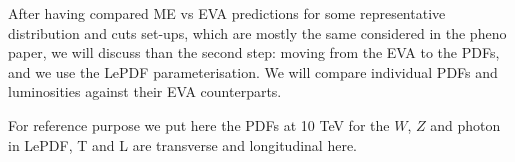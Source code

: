 \documentclass[a4paper,11pt]{article}
\begin{document}
\begin{table}[!t]
\begin{center}
\caption{
EW chiral couplings and coupling strength normalizations used in the EVA for fermions $f,f'$ with weak isospin charge $(T_3^f)_L=\pm1/2$ and electric charge $Q^f$, with normalization $Q^\ell=-1$.
}
\label{tab:ewa_coup}
\end{center}
\end{table}



After having compared ME vs EVA predictions for some representative distribution and cuts set-ups, which are mostly the same considered in the pheno paper, we will discuss than the second step: moving from the EVA to the PDFs, and we use the {\small \sc LePDF} parameterisation.
We will compare individual PDFs and luminosities against their EVA counterparts.

For reference purpose we put here the PDFs at 10 TeV for the $W$, $Z$ and photon in {\small \sc LePDF}, T and L are transverse and longitudinal here.
\end{document}
